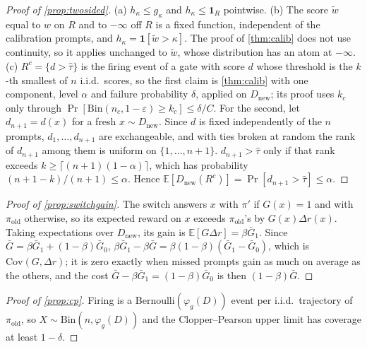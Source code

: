 \documentclass{article}
\theoremstyle{plain}
\theoremstyle{definition}
\theoremstyle{remark}
\newcommand{\E}{\mathbb{E}}
\newcommand{\Dnew}{D_{\mathrm{new}}}
\newcommand{\pold}{\pi_{\mathrm{old}}}
\newcommand{\ind}{\mathbf{1}}
\begin{document}
\begin{proof}[Proof of \cref{prop:twosided}]
(a) $h_\kappa\le g_\kappa$ and $h_\kappa\le\ind_R$ pointwise. (b) The score $\tilde w$ equal to $w$ on $R$ and to $-\infty$ off $R$ is a fixed function, independent of the
calibration prompts, and $h_\kappa=\ind[\tilde w>\kappa]$. The proof of \cref{thm:calib} does not use continuity, so it
applies unchanged to $\tilde w$, whose distribution has an atom at $-\infty$. (c) $R^c=\{d>\hat\tau\}$ is the firing event of a gate with score $d$ whose threshold is the $k$-th
smallest of $n$ i.i.d.\ scores, so the first claim is \cref{thm:calib} with one component, level $\alpha$ and failure
probability $\delta$, applied on $\Dnew$; its proof uses $k_c$ only through $\Pr[\mathrm{Bin}(n_c,1-\varepsilon)\ge k_c]\le\delta/C$. For the second, let $d_{n+1}=d(x)$ for a
fresh $x\sim\Dnew$. Since $d$ is fixed independently of the $n$ prompts, $d_1,\dots,d_{n+1}$ are exchangeable, and
with ties broken at random the rank of $d_{n+1}$ among them is uniform on $\{1,\dots,n+1\}$. $d_{n+1}>\hat\tau$ only
if that rank exceeds $k\ge\lceil(n+1)(1-\alpha)\rceil$, which has probability $(n+1-k)/(n+1)\le\alpha$. Hence
$\E[\Dnew(R^c)]=\Pr[d_{n+1}>\hat\tau]\le\alpha$.
\end{proof}

\begin{proof}[Proof of \cref{prop:switchgain}]
The switch answers $x$ with $\pi'$ if $G(x)=1$ and with $\pold$ otherwise, so its expected reward on $x$ exceeds
$\pold$'s by $G(x)\Delta r(x)$. Taking expectations over $\Dnew$, its gain is $\E[G\Delta r]=\beta\bar G_1$. Since
$\bar G=\beta\bar G_1+(1-\beta)\bar G_0$, $\beta\bar G_1-\beta\bar G=\beta(1-\beta)(\bar G_1-\bar G_0)$, which is
$\mathrm{Cov}(G,\Delta r)$; it is zero exactly when missed prompts gain as much on average as the others, and the
cost $\bar G-\beta\bar G_1=(1-\beta)\bar G_0$ is then $(1-\beta)\bar G$.
\end{proof}

\begin{proof}[Proof of \cref{prop:cp}]
Firing is a Bernoulli$(\varphi_g(D))$ event per i.i.d.\ trajectory of $\pold$, so $X\sim\mathrm{Bin}(n,\varphi_g(D))$
and the Clopper--Pearson upper limit has coverage at least $1-\delta$.
\end{proof}
\end{document}
